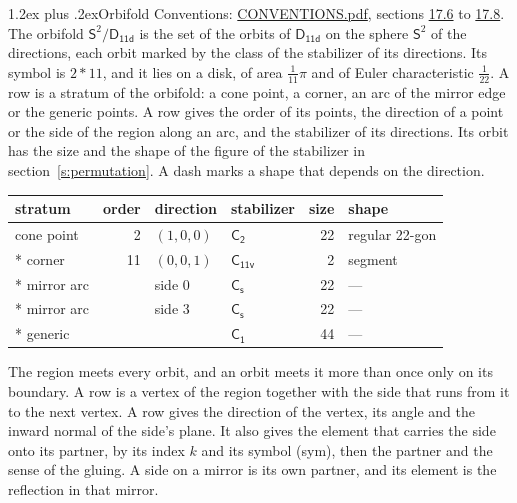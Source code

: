 \documentclass[10pt,a4paper]{article}
\makeatletter
\renewcommand\section{\@startsection{section}{1}{\z@}{-3ex plus -1ex minus -.2ex}%
  {1.2ex plus .2ex}{\normalfont\large\sffamily\bfseries\color{parttitle}}}
\numberwithin{equation}{section}
\newcommand{\grp}[1]{\mathsf{#1}}
\newcommand{\orbname}[1]{#1}
\newcommand{\dirvec}[3]{(#1, #2, #3)}
\newcommand{\twosphere}{\mathsf{S}^{2}}
\makeatother
\begin{document}
\section{Orbifold}\label{s:orbifold}
Conventions: \href{../../CONVENTIONS.pdf}{CONVENTIONS.pdf}, sections \href{../../CONVENTIONS.pdf\#conv.17.6}{17.6} to \href{../../CONVENTIONS.pdf\#conv.17.8}{17.8}.
The orbifold $\twosphere/\grp{D_{11d}}$ is the set of the orbits of $\grp{D_{11d}}$ on the sphere $\twosphere$ of the directions, each orbit marked by the class of the stabilizer of its directions. Its symbol is $\orbname{2{\ast}11}$, and it lies on a disk, of area $\tfrac{1}{11}\pi$ and of Euler characteristic $\tfrac{1}{22}$.
\leavevmode\label{n:head.stratum}\label{n:head.order.point}\label{n:head.direction}\label{n:head.stabilizer}\label{n:head.size.orbit}\label{n:head.shape}A row is a stratum of the orbifold: a cone point, a corner, an arc of the mirror edge or the generic points. A row gives the order of its points, the direction of a point or the side of the region along an arc, and the stabilizer of its directions. Its orbit has the size and the shape of the figure of the stabilizer in section~\ref{s:permutation}. A dash marks a shape that depends on the direction.
{\small\setlength{\tabcolsep}{4pt}\begin{longtable}{@{}lrllrl@{}}\toprule
stratum & order & direction & stabilizer & size & shape\\\midrule\endhead
\bottomrule\endfoot\endlastfoot
cone point & 2 & $\dirvec{1}{0}{0}$ & \href{C2.pdf}{$\grp{C_{2}}$} & 22 & regular 22-gon\\*
corner & 11 & $\dirvec{0}{0}{1}$ & \href{C11v.pdf}{$\grp{C_{11v}}$} & 2 & segment\\*
mirror arc &  & side 0 & \href{C1v.pdf}{$\grp{C_{s}}$} & 22 & ---\\*
mirror arc &  & side 3 & \href{C1v.pdf}{$\grp{C_{s}}$} & 22 & ---\\*
generic &  &  & \href{C1.pdf}{$\grp{C_{1}}$} & 44 & ---\\
\bottomrule\end{longtable}}
\leavevmode\label{n:head.vertex.region}\label{n:head.angle}\label{n:head.normal.side}\label{n:head.partner}\label{n:head.sense}The region meets every orbit, and an orbit meets it more than once only on its boundary. A row is a vertex of the region together with the side that runs from it to the next vertex. A row gives the direction of the vertex, its angle and the inward normal of the side's plane. It also gives the element that carries the side onto its partner, by its index $k$ and its symbol (sym), then the partner and the sense of the gluing. A side on a mirror is its own partner, and its element is the reflection in that mirror.
\end{document}
